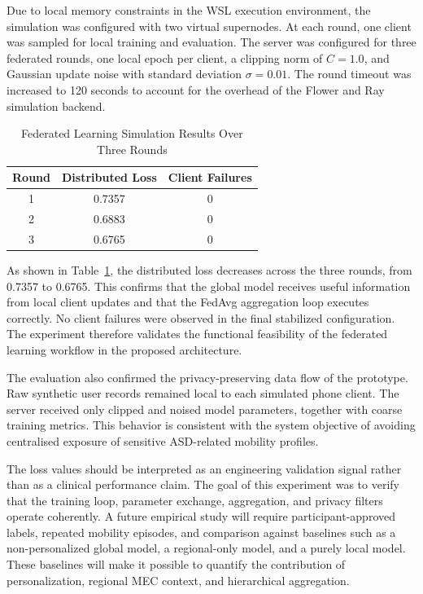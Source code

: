 \documentclass[lettersize,journal]{IEEEtran}
\begin{document}
Due to local memory constraints in the WSL execution environment, the
simulation was configured with two virtual supernodes. At each round,
one client was sampled for local training and evaluation. The server was
configured for three federated rounds, one local epoch per client, a
clipping norm of $C=1.0$, and Gaussian update noise with standard
deviation $\sigma=0.01$. The round timeout was increased to 120 seconds
to account for the overhead of the Flower and Ray simulation backend.

\begin{table}[!t]
    \centering
    \caption{Federated Learning Simulation Results Over Three Rounds\label{tab:fl_results}}
    \scriptsize
    \renewcommand{\arraystretch}{1.2}
    \begin{tabular}{ccc}
        \toprule
        \textbf{Round} & \textbf{Distributed Loss} & \textbf{Client Failures} \\
        \midrule
        1 & 0.7357 & 0 \\
        2 & 0.6883 & 0 \\
        3 & 0.6765 & 0 \\
        \bottomrule
    \end{tabular}
\end{table}

As shown in Table~\ref{tab:fl_results}, the distributed loss decreases
across the three rounds, from 0.7357 to 0.6765. This confirms that the
global model receives useful information from local client updates and
that the FedAvg aggregation loop executes correctly. No client failures
were observed in the final stabilized configuration. The experiment
therefore validates the functional feasibility of the federated
learning workflow in the proposed architecture.

The evaluation also confirmed the privacy-preserving data flow of the
prototype. Raw synthetic user records remained local to each simulated
phone client. The server received only clipped and noised model
parameters, together with coarse training metrics. This behavior is
consistent with the system objective of avoiding centralised exposure
of sensitive ASD-related mobility profiles.

The loss values should be interpreted as an engineering validation
signal rather than as a clinical performance claim. The goal of this
experiment was to verify that the training loop, parameter exchange,
aggregation, and privacy filters operate coherently. A future empirical
study will require participant-approved labels, repeated mobility
episodes, and comparison against baselines such as a non-personalized
global model, a regional-only model, and a purely local model. These
baselines will make it possible to quantify the contribution of
personalization, regional MEC context, and hierarchical aggregation.
\end{document}
